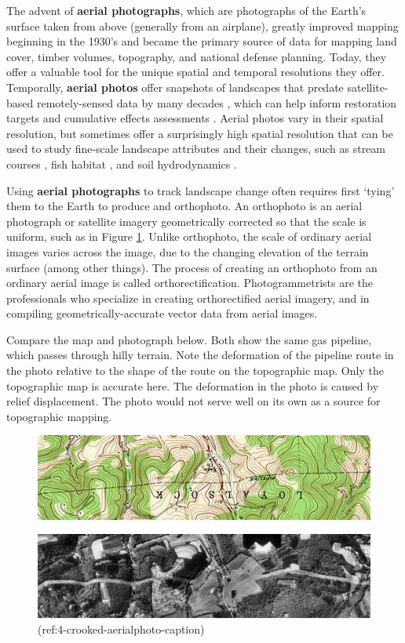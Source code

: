 \documentclass[
]{book}
\begin{document}
The advent of \textbf{aerial photographs}, which are photographs of the Earth's surface taken from above (generally from an airplane), greatly improved mapping beginning in the 1930's and became the primary source of data for mapping land cover, timber volumes, topography, and national defense planning. Today, they offer a valuable tool for the unique spatial and temporal resolutions they offer. Temporally, \textbf{aerial photos} offer snapshots of landscapes that predate satellite-based remotely-sensed data by many decades \citep{morgan_historical_2017}, which can help inform restoration targets and cumulative effects assessments \citep{harker_perspectives_2021}. Aerial photos vary in their spatial resolution, but sometimes offer a surprisingly high spatial resolution that can be used to study fine-scale landscape attributes and their changes, such as stream courses \citep{little_channel_2013}, fish habitat \citep{tomlinson_long-term_2011}, and soil hydrodynamics \citep{harker_perspectives_2021}.

Using \textbf{aerial photographs} to track landscape change often requires first `tying' them to the Earth to produce and orthophoto. An orthophoto is an aerial photograph or satellite imagery geometrically corrected so that the scale is uniform, such as in Figure \ref{fig:4-crooked-aerialphoto}. Unlike orthophoto, the scale of ordinary aerial images varies across the image, due to the changing elevation of the terrain surface (among other things). The process of creating an orthophoto from an ordinary aerial image is called orthorectification. Photogrammetrists are the professionals who specialize in creating orthorectified aerial imagery, and in compiling geometrically-accurate vector data from aerial images.

Compare the map and photograph below. Both show the same gas pipeline, which passes through hilly terrain. Note the deformation of the pipeline route in the photo relative to the shape of the route on the topographic map. Only the topographic map is accurate here. The deformation in the photo is caused by relief displacement. The photo would not serve well on its own as a source for topographic mapping.



\begin{figure}
\includegraphics[width=0.75\linewidth]{images/04-crooked-aerialphoto} \caption{(ref:4-crooked-aerialphoto-caption)}\label{fig:4-crooked-aerialphoto}
\end{figure}
\end{document}
